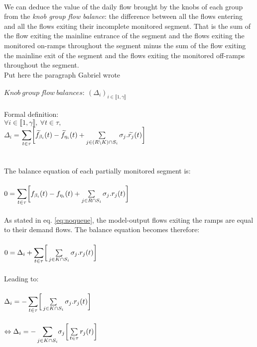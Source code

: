 \\
We can deduce the value of the daily flow brought by the knobs of each group from the \emph{knob group flow balance}: the difference between all the flows entering and all the flows exiting their incomplete monitored segment. That is the sum of the flow exiting the mainline entrance of the segment and the flows exiting the monitored on-ramps throughout the segment minus the sum of the flow exiting the mainline exit of the segment and the flows exiting the monitored off-ramps throughout the segment. \\ 
\color{red}Put here the paragraph Gabriel wrote\color{black}\\
\\
$Knob\ group\ flow\ balances:\ (\Delta_{i})_{i\in \llbracket 1,\gamma \rrbracket} $\\
\\
Formal definition:\\
$\forall i \in \llbracket 1,\gamma \rrbracket,\ \forall t\in \tau,$\\
$\Delta_{i} =$\small $\mathlarger{\sum\limits_{t\in \tau}}\bigg[\widetilde{f}_{\beta_{i}}(t)-\widetilde{f}_{\eta_{i}}(t)+\sum\limits_{j\in (R\backslash K)\cap S_{i}}\sigma_{j}.\widetilde{r_{j}}(t)\bigg]$\normalsize 
\\
\\
\\
The balance equation of each partially monitored segment is:\\
\\
$0=\mathlarger{\sum\limits_{t\in \tau}}\bigg[f_{\beta_{i}}(t)-f_{\eta_{i}}(t)+\sum\limits_{j\in R\cap S_{i}}\sigma_{j}.r_{j}(t)\bigg]$\\
\\
As stated in eq. \ref{eq:noqueue}, the model-output flows exiting the ramps are equal to their demand flows. The balance equation becomes therefore:\\
\\
$0=\Delta_{i}+\mathlarger{\sum\limits_{t\in \tau}}\bigg[\sum\limits_{j\in K\cap S_{i}}\sigma_{j}.r_{j}(t)\bigg]$\\
\\
Leading to:\\
\\
$\Delta_{i}=\mathlarger{-\sum\limits_{t\in \tau}}\bigg[\sum\limits_{j\in K\cap S_{i}}\sigma_{j}.r_{j}(t)\bigg]$\\
\\
$\Leftrightarrow \Delta_{i}=\mathlarger{-\sum\limits_{j\in K\cap S_{i}}}\sigma_{j}\bigg[\sum\limits_{t\in \tau}r_{j}(t)\bigg]$\\

